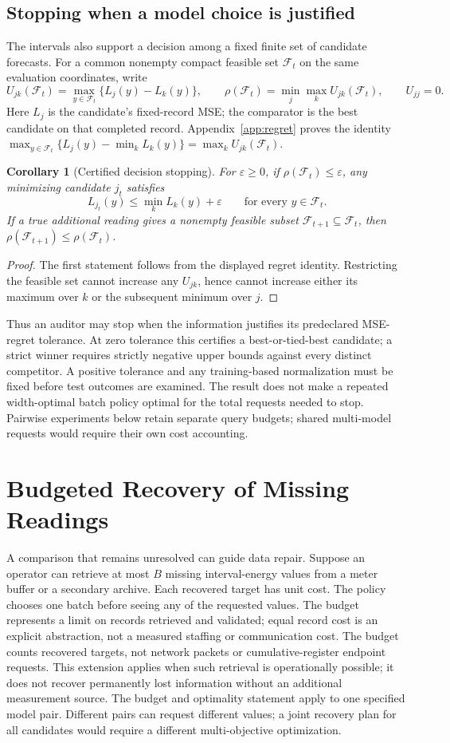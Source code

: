 \documentclass[12pt]{article}
\newtheorem{corollary}{Corollary}
\newcommand{\F}{\mathcal{F}}
\begin{document}
\subsection{Stopping when a model choice is justified}\label{sec:decision-stopping}
The intervals also support a decision among a fixed finite set of candidate
forecasts. For a common nonempty compact feasible set $\F_t$ on the same
evaluation coordinates, write
\[
 U_{jk}(\F_t)=\max_{y\in\F_t}\{L_j(y)-L_k(y)\},\qquad
 \rho(\F_t)=\min_j\max_k U_{jk}(\F_t),\qquad U_{jj}=0.
\]
Here $L_j$ is the candidate's fixed-record MSE; the comparator is the best
candidate on that completed record. Appendix~\ref{app:regret} proves the
identity $\max_{y\in\F_t}\{L_j(y)-\min_kL_k(y)\}=\max_kU_{jk}(\F_t)$.
\begin{corollary}[Certified decision stopping]\label{cor:decision-stopping}
For $\varepsilon\geq0$, if $\rho(\F_t)\leq\varepsilon$, any minimizing
candidate $j_t$ satisfies
\[
 L_{j_t}(y)\leq\min_k L_k(y)+\varepsilon\qquad\text{for every }y\in\F_t.
\]
If a true additional reading gives a nonempty feasible subset
$\F_{t+1}\subseteq\F_t$, then $\rho(\F_{t+1})\leq\rho(\F_t)$.
\end{corollary}
\begin{proof}
The first statement follows from the displayed regret identity. Restricting
the feasible set cannot increase any $U_{jk}$, hence cannot increase either
its maximum over $k$ or the subsequent minimum over $j$.
\end{proof}
Thus an auditor may stop when the information justifies its predeclared
MSE-regret tolerance. At zero tolerance this certifies a best-or-tied-best
candidate; a strict winner requires strictly negative upper bounds against
every distinct competitor. A positive tolerance and any training-based
normalization must be fixed before test outcomes are examined. The result
does not make a repeated width-optimal batch policy optimal for the total
requests needed to stop. Pairwise experiments below retain separate query
budgets; shared multi-model requests would require their own cost accounting.

\section{Budgeted Recovery of Missing Readings}
A comparison that remains unresolved can guide data repair.
Suppose an operator can retrieve at most $B$ missing interval-energy values
from a meter buffer or a secondary archive. Each recovered target has unit
cost. The policy chooses one batch before seeing any of the requested
values. The budget represents a limit on records retrieved and validated;
equal record cost is an explicit abstraction, not a measured staffing or
communication cost. The budget counts recovered targets, not network packets or
cumulative-register endpoint requests. This extension applies when such
retrieval is operationally possible; it does not recover permanently lost
information without an additional measurement source. The budget and
optimality statement apply to one specified model pair. Different pairs
can request different values; a joint recovery plan for all candidates
would require a different multi-objective optimization.
\end{document}
